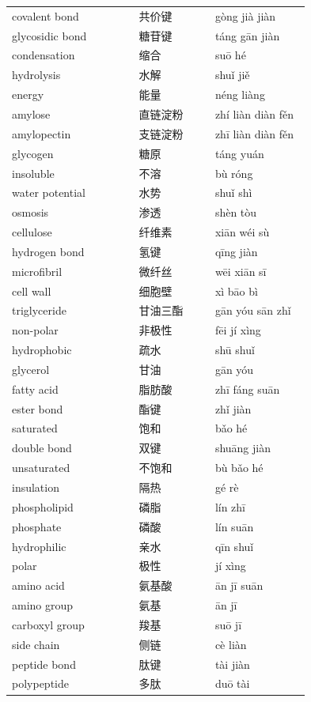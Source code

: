 \documentclass[11pt]{article}
\begin{document}
\begin{longtable}{@{}p{0.40\linewidth}p{0.24\linewidth}p{0.30\linewidth}@{}}
covalent bond & 共价键 & gòng jià jiàn \\
glycosidic bond & 糖苷键 & táng gān jiàn \\
condensation & 缩合 & suō hé \\
hydrolysis & 水解 & shuǐ jiě \\
energy & 能量 & néng liàng \\
amylose & 直链淀粉 & zhí liàn diàn fěn \\
amylopectin & 支链淀粉 & zhī liàn diàn fěn \\
glycogen & 糖原 & táng yuán \\
insoluble & 不溶 & bù róng \\
water potential & 水势 & shuǐ shì \\
osmosis & 渗透 & shèn tòu \\
cellulose & 纤维素 & xiān wéi sù \\
hydrogen bond & 氢键 & qīng jiàn \\
microfibril & 微纤丝 & wēi xiān sī \\
cell wall & 细胞壁 & xì bāo bì \\
triglyceride & 甘油三酯 & gān yóu sān zhǐ \\
non-polar & 非极性 & fēi jí xìng \\
hydrophobic & 疏水 & shū shuǐ \\
glycerol & 甘油 & gān yóu \\
fatty acid & 脂肪酸 & zhī fáng suān \\
ester bond & 酯键 & zhǐ jiàn \\
saturated & 饱和 & bǎo hé \\
double bond & 双键 & shuāng jiàn \\
unsaturated & 不饱和 & bù bǎo hé \\
insulation & 隔热 & gé rè \\
phospholipid & 磷脂 & lín zhī \\
phosphate & 磷酸 & lín suān \\
hydrophilic & 亲水 & qīn shuǐ \\
polar & 极性 & jí xìng \\
amino acid & 氨基酸 & ān jī suān \\
amino group & 氨基 & ān jī \\
carboxyl group & 羧基 & suō jī \\
side chain & 侧链 & cè liàn \\
peptide bond & 肽键 & tài jiàn \\
polypeptide & 多肽 & duō tài \\

\end{longtable}
\end{document}
